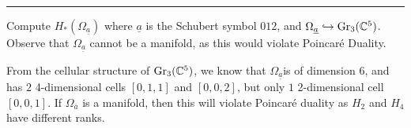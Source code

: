 \documentclass[letterpaper, 12pt]{article}
\begin{document}
\noindent\rule{7in}{2.8pt}
\begin{problem}{2}
Compute \(H_*(\Omega_{\underline{a}})\) where \(\underline{a}\) is the Schubert symbol \(012\), and \(\Omega_{\underline{a}}\hookrightarrow \text{Gr}_3(\mathbb{C}^5)\). Observe that \(\Omega_{\underline{a}}\) cannot be a manifold, as this would violate Poincaré Duality.
\end{problem}
\begin{solution}
From the cellular structure of \(\text{Gr}_3(\mathbb{C}^5)\), we know that \(\Omega_{\underline{a}}\)is of dimension \(6\), and has \(2\) 4-dimensional cells \([0,1,1]\) and \([0,0,2]\), but only \(1\) 2-dimensional cell \([0,0,1]\). If \(\Omega_{\overline{a}}\) is a manifold, then this will violate Poincaré duality as \(H_2\) and \(H_4\) have different ranks.
\end{solution}
\end{document}
